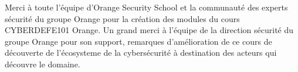 

\newpage

\thispagestyle{empty}

\begin{center}


\large{Merci à toute l'équipe d'Orange Security School et la communauté des experts sécurité du groupe Orange pour la création des modules du cours CYBERDEFE101 Orange.
Un grand merci à l'équipe de la direction sécurité du groupe Orange pour son support, remarques d'amélioration de ce cours de découverte de l'écosysteme de la cybersécurité à destination des acteurs qui découvre le domaine. 
}



\end{center}




\clearpage 





